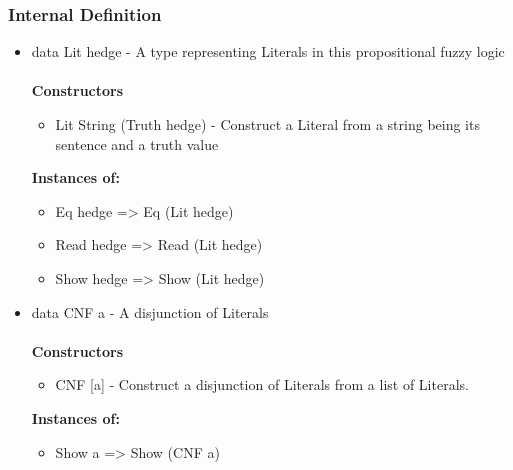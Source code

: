 \documentclass[../gr-final.tex]{subfiles}
\begin{document}
\subsubsection{Internal Definition}
\begin{itemize}
        \item data Lit hedge - A type representing Literals in this propositional fuzzy
                logic\\\\
         {\bfseries Constructors}
         \begin{itemize}
                 \item  Lit String (Truth hedge) - Construct a
                         Literal from a string being its sentence and a truth value 
         \end{itemize}
         {\bfseries Instances of:}
          \begin{itemize}
            \item Eq hedge => Eq (Lit hedge)
            \item Read hedge => Read (Lit hedge) 
            \item Show hedge => Show (Lit hedge)
          \end{itemize}

         \item data CNF a - A disjunction of Literals\\\\
         {\bfseries Constructors}
         \begin{itemize}
          \item CNF [a] - Construct a disjunction of Literals
                  from a list of Literals.
         \end{itemize}
        {\bfseries Instances of:}
        \begin{itemize}
         \item Show a => Show (CNF a)
        \end{itemize}


\end{itemize}
\end{document}
